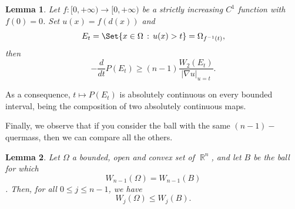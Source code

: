 \documentclass[oneside,a4paper,11pt,notitlepage]{article}
\newcommand{\abs}[1]{{\left|#1\right|}}
\theoremstyle{plain}
\numberwithin{teor}{section}
\numberwithin{equation}{section}
\theoremstyle{definition}
\theoremstyle{plain}
\newtheorem{lemma}[lemma]{Lemma}
\theoremstyle{plain}
\theoremstyle{plain}
\theoremstyle{plain}
\theoremstyle{definition}
\theoremstyle{definition}
\theoremstyle{plain}
\DeclareMathOperator{\R}{\mathbb{R}}
\begin{document}
\begin{lemma}
    \label{lemma_derivata_perimetro_2}
    Let $f \colon [0,+\infty) \to [0,+\infty)$ be a strictly increasing $C^1$ function with $f(0)=0$. Set $u(x)=f(d(x))$ and
    \[
    E_t = \Set{ x \in \Omega \, : \, u(x) > t } = \Omega_{f^{-1}(t)},
    \]
    then
    \begin{equation}
        \label{eq_lemma_2}
        -\frac{d}{dt} P(E_t) \geq (n-1) \frac{W_2(E_t)}{\abs{\nabla u}_{u=t}}.
    \end{equation}
\end{lemma}


As a consequence, $t\mapsto P(E_t)$ is absolutely continuous on every bounded
interval, being the composition of two absolutely continuous maps.


Finally, we observe that if you consider the ball with the same $(n-1)-$quermass, then we can compare all the others.

\begin{lemma}
\label{lemmadp}
    Let $\Omega$ a bounded, open and convex set of $\R^n$, and let $B$ be the ball for which $$W_{n-1}(\Omega)= W_{n-1}(B)$$. Then, for all $0 \leq j \leq n-1$, we have
    $$W_j(\Omega) \leq W_j(B).$$
\end{lemma}
\end{document}
